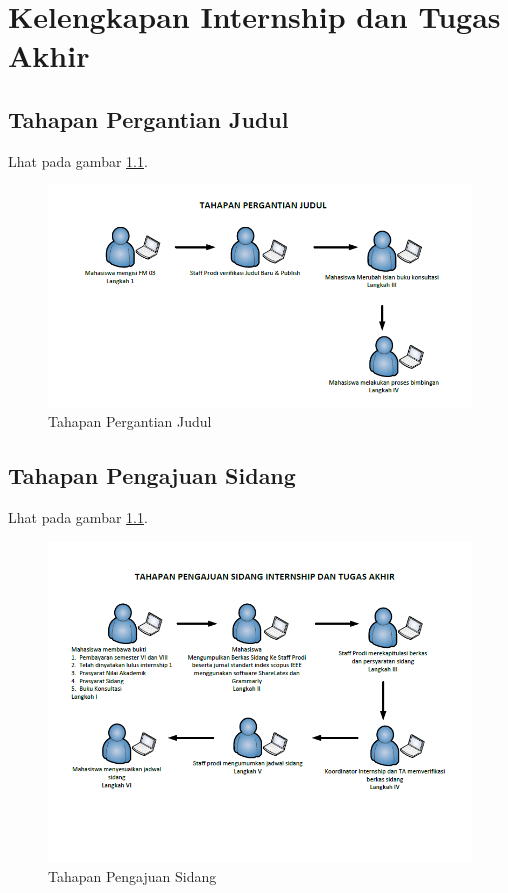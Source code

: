 \chapter{Kelengkapan Internship dan Tugas Akhir}

\section{Tahapan Pergantian Judul}
Lhat pada gambar \ref{figure:P2}.
\begin{figure}[ht]
	\centerline{\includegraphics[width=1\textwidth]{figures/ganti_judul.png}}
	\caption{Tahapan Pergantian Judul}
	\label{figure:P2}
	\end{figure}

\section{Tahapan Pengajuan Sidang}
Lhat pada gambar \ref{figure:P2}.
\begin{figure}[ht]
	\centerline{\includegraphics[width=1\textwidth]{figures/draft.png}}
	\caption{Tahapan Pengajuan Sidang}
	\label{figure:P3}
	\end{figure}
